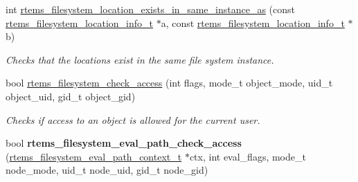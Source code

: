 \begin{DoxyCompactItemize}
\item 
int \mbox{\hyperlink{group__LibIOInternal_gad070afa17e85fbb4b8f96a954ba4fda4}{rtems\+\_\+filesystem\+\_\+location\+\_\+exists\+\_\+in\+\_\+same\+\_\+instance\+\_\+as}} (const \mbox{\hyperlink{group__LibIO_ga3252b3d31ee3c49ffff0b7604a676864}{rtems\+\_\+filesystem\+\_\+location\+\_\+info\+\_\+t}} $\ast$a, const \mbox{\hyperlink{group__LibIO_ga3252b3d31ee3c49ffff0b7604a676864}{rtems\+\_\+filesystem\+\_\+location\+\_\+info\+\_\+t}} $\ast$b)
\begin{DoxyCompactList}\small\item\em Checks that the locations exist in the same file system instance. \end{DoxyCompactList}\item 
bool \mbox{\hyperlink{group__LibIOInternal_ga411917db0d9b800480d1055734e81590}{rtems\+\_\+filesystem\+\_\+check\+\_\+access}} (int flags, mode\+\_\+t object\+\_\+mode, uid\+\_\+t object\+\_\+uid, gid\+\_\+t object\+\_\+gid)
\begin{DoxyCompactList}\small\item\em Checks if access to an object is allowed for the current user. \end{DoxyCompactList}\item 
\mbox{\label{group__LibIOInternal_gad65ec2b7ee831bdb93222e13abaee695}} 
bool {\bfseries rtems\+\_\+filesystem\+\_\+eval\+\_\+path\+\_\+check\+\_\+access} (\mbox{\hyperlink{structrtems__filesystem__eval__path__context__t}{rtems\+\_\+filesystem\+\_\+eval\+\_\+path\+\_\+context\+\_\+t}} $\ast$ctx, int eval\+\_\+flags, mode\+\_\+t node\+\_\+mode, uid\+\_\+t node\+\_\+uid, gid\+\_\+t node\+\_\+gid)
\end{DoxyCompactItemize}
